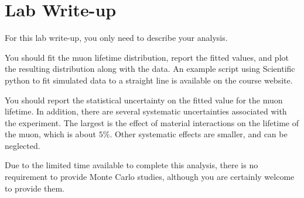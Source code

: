 \documentclass[12pt]{article}
\begin{document}



\section{Lab Write-up}

For this lab write-up, you only need to describe your analysis. 

You should fit the muon lifetime distribution, report the fitted values, and plot the resulting distribution along with the data.  An example script using Scientific python to fit simulated data to a straight line is available on the course website.

You should report the statistical uncertainty on the fitted value for the muon lifetime.    In addition, there are several systematic uncertainties associated with the experiment.  The largest is the effect of material interactions on the lifetime of the muon, which is about $5\%$.   Other systematic effects are smaller, and can be neglected.

Due to the limited time available to complete this analysis, there is no requirement to provide Monte Carlo studies, although you are certainly welcome to provide them.
\end{document}

